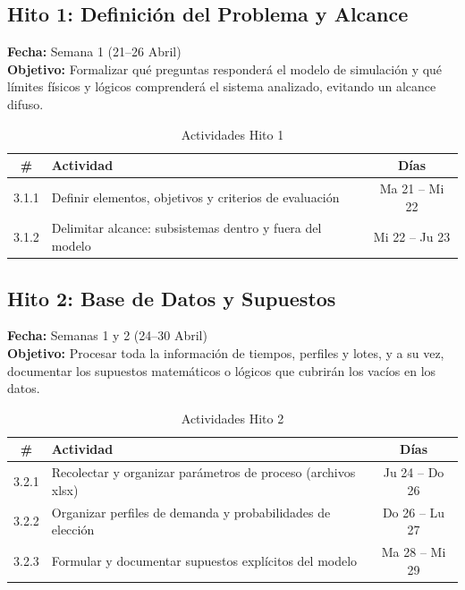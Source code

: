 \documentclass[11pt,letterpaper]{article}
\begin{document}
\subsection{Hito 1: Definición del Problema y Alcance}
\textbf{Fecha:} Semana 1 (21–26 Abril)\\
\textbf{Objetivo:} Formalizar qué preguntas responderá el modelo de simulación y qué límites físicos y lógicos comprenderá el sistema analizado, evitando un alcance difuso.

\begin{table}[h!]
    \centering
    \small
    \caption{Actividades Hito 1}
    \vspace{0.2cm}
    \begin{tabular}{cp{10cm}c}
        \toprule
        \textbf{\#} & \textbf{Actividad} & \textbf{Días} \\
        \midrule
        3.1.1 & Definir elementos, objetivos y criterios de evaluación & Ma 21 -- Mi 22 \\
        3.1.2 & Delimitar alcance: subsistemas dentro y fuera del modelo & Mi 22 -- Ju 23 \\
        \bottomrule
    \end{tabular}
\end{table}

\subsection{Hito 2: Base de Datos y Supuestos}
\textbf{Fecha:} Semanas 1 y 2 (24–30 Abril)\\
\textbf{Objetivo:} Procesar toda la información de tiempos, perfiles y lotes, y a su vez, documentar los supuestos matemáticos o lógicos que cubrirán los vacíos en los datos.

\begin{table}[h!]
    \centering
    \small
    \caption{Actividades Hito 2}
    \vspace{0.2cm}
    \begin{tabular}{cp{10cm}c}
        \toprule
        \textbf{\#} & \textbf{Actividad} & \textbf{Días} \\
        \midrule
        3.2.1 & Recolectar y organizar parámetros de proceso (archivos xlsx) & Ju 24 -- Do 26 \\
        3.2.2 & Organizar perfiles de demanda y probabilidades de elección & Do 26 -- Lu 27 \\
        3.2.3 & Formular y documentar supuestos explícitos del modelo & Ma 28 -- Mi 29 \\
        \bottomrule
    \end{tabular}
\end{table}
\end{document}

